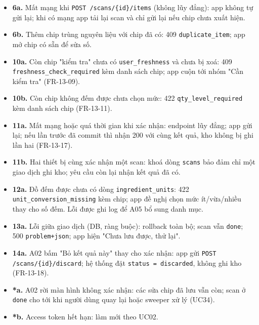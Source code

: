 \begin{itemize}
\item \textbf{6a.} Mất mạng khi {\small\texttt{POST /\allowbreak{}\allowbreak{}scans/\allowbreak{}\allowbreak{}\{id\}/\allowbreak{}\allowbreak{}items}} (không lũy đẳng): app không tự gửi lại; khi có mạng app tải lại scan và chỉ gửi lại nếu chip chưa xuất hiện.
\item \textbf{6b.} Thêm chip trùng nguyên liệu với chip đã có: 409 {\small\texttt{duplicate\_\allowbreak{}\allowbreak{}item}}; app mở chip có sẵn để sửa số.
\item \textbf{10a.} Còn chip "kiểm tra" chưa có {\small\texttt{user\_\allowbreak{}\allowbreak{}freshness}} và chưa bị xoá: 409 {\small\texttt{freshness\_\allowbreak{}\allowbreak{}check\_\allowbreak{}\allowbreak{}required}} kèm danh sách chip; app cuộn tới nhóm "Cần kiểm tra" (FR-\allowbreak{}13-\allowbreak{}09).
\item \textbf{10b.} Còn chip không đếm được chưa chọn mức: 422 {\small\texttt{qty\_\allowbreak{}\allowbreak{}level\_\allowbreak{}\allowbreak{}required}} kèm danh sách chip (FR-\allowbreak{}13-\allowbreak{}11).
\item \textbf{11a.} Mất mạng hoặc quá thời gian khi xác nhận: endpoint lũy đẳng; app gửi lại; nếu lần trước đã commit thì nhận 200 với cùng kết quả, kho không bị ghi lần hai (FR-\allowbreak{}13-\allowbreak{}17).
\item \textbf{11b.} Hai thiết bị cùng xác nhận một scan: khoá dòng {\small\texttt{scans}} bảo đảm chỉ một giao dịch ghi kho; yêu cầu còn lại nhận kết quả đã có.
\item \textbf{12a.} Đồ đếm được chưa có dòng {\small\texttt{ingredient\_\allowbreak{}\allowbreak{}units}}: 422 {\small\texttt{unit\_\allowbreak{}\allowbreak{}conversion\_\allowbreak{}\allowbreak{}missing}} kèm chip; app đề nghị chọn mức ít/\allowbreak{}vừa/\allowbreak{}nhiều thay cho số đếm. Lỗi được ghi log để A05 bổ sung danh mục.
\item \textbf{13a.} Lỗi giữa giao dịch (DB, ràng buộc): rollback toàn bộ; scan vẫn {\small\texttt{done}}; 500 {\small\texttt{problem+json}}; app hiện "Chưa lưu được, thử lại".
\item \textbf{14a.} A02 bấm "Bỏ kết quả này" thay cho xác nhận: app gửi {\small\texttt{POST /\allowbreak{}\allowbreak{}scans/\allowbreak{}\allowbreak{}\{id\}/\allowbreak{}\allowbreak{}discard}}; hệ thống đặt {\small\texttt{status = discarded}}, không ghi kho (FR-\allowbreak{}13-\allowbreak{}18).
\item \textbf{*a.} A02 rời màn hình không xác nhận: các sửa chip đã lưu vẫn còn; scan ở {\small\texttt{done}} cho tới khi người dùng quay lại hoặc sweeper xử lý (UC34).
\item \textbf{*b.} Access token hết hạn: làm mới theo UC02.
\end{itemize}
